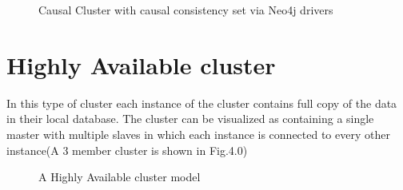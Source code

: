 \documentclass[9pt,twocolumn,twoside]{../../styles/osajnl}
\begin{document}
\begin{figure}[htbp]
\centering
{}
\caption{Causal Cluster with causal consistency set via Neo4j drivers ~\cite{www-neo4j-causal}}
\label{fig:false-color}
\end{figure}

\section{Highly Available cluster}
In this type of cluster each instance of the cluster contains full copy of the data in their local database. The cluster can be visualized as containing a single master with multiple slaves in which each instance is connected to every other instance(A 3 member cluster is shown in Fig.4.0)

\begin{figure}[htbp]
\centering
{}
\caption{A Highly Available cluster model~\cite{www-neo4j-ha}}
\label{fig:false-color}
\end{figure}
\end{document}
